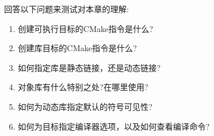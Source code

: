 回答以下问题来测试对本章的理解:

\begin{enumerate}
\item 
创建可执行目标的CMake指令是什么?
	
\item 
创建库目标的CMake指令是什么?

\item 
如何指定库是静态链接，还是动态链接?

\item 
对象库有什么特别之处?在哪里使用?

\item 
如何为动态库指定默认的符号可见性?

\item 
如何为目标指定编译器选项，以及如何查看编译命令?
\end{enumerate}